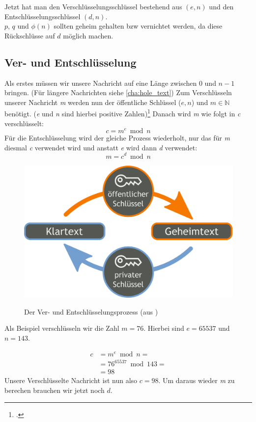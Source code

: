 \documentclass[12pt,a4paper]{scrartcl}
\begin{document}
Jetzt hat man den Verschlüsselungsschlüssel bestehend aus $(e, n)$ und den Entschlüsselungsschlüssel $(d, n)$. \\
$p$, $q$ und $\phi(n)$ sollten geheim gehalten bzw vernichtet werden, da diese Rückschlüsse auf $d$ möglich machen.
	
	\subsection{Ver- und Entschlüsselung}
	Als erstes müssen wir unsere Nachricht auf eine Länge zwischen 0 und $n-1$ bringen. (Für längere Nachrichten siehe \ref{cha:hole_text})
	Zum Verschlüsseln unserer Nachricht \textit{m} werden nun der öffentliche Schlüssel ($e, n$) und $m \in \mathbb{N}$ benötigt. (\textit{e} und \textit{n} sind hierbei positive Zahlen)\footcite[][6]{rsaOriginalPaper} Danach wird \textit{m} wie folgt in \textit{c} verschlüsselt: 
	$$c = m^e \bmod n$$
	Für die Entschlüsselung wird der gleiche Prozess wiederholt, nur das für \textit{m} diesmal \textit{c} verwendet wird und anstatt \textit{e} wird dann \textit{d} verwendet:
	$$m = c^d \bmod n$$
	
	\begin{figure}
	\includegraphics[scale=0.05]{Orange_blue_public_key_cryptography_de.svg.png} \\
	\caption{Der Ver- und Entschlüsselungsprozess (aus \cite{wikipedia})}
	\label{fig:figure1}
	\end{figure}
	
	Als Beispiel verschlüsseln wir die Zahl $m = 76$. Hierbei sind $e=65537$ und $n=143$.

	\begin{equation}
	\begin{split}
	c & = m^e \bmod n = \\
	 &  = 76^{65537} \bmod 143 = \\
 	& = 98
	\end{split}
	\end{equation}
	Unsere Verschlüsselte Nachricht ist nun also $c = 98$. Um daraus wieder \textit{m} zu berechen brauchen wir jetzt noch $d$.
\end{document}

